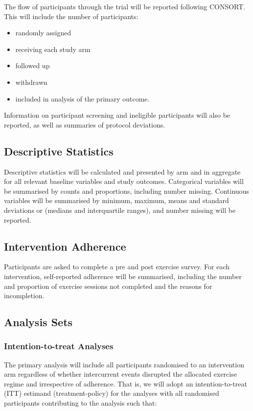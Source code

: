 \documentclass[11pt,parskip=half-]{scrartcl}
\providecommand{\tightlist}{%
  \setlength{\itemsep}{0pt}\setlength{\parskip}{0pt}}
\begin{document}
The flow of participants through the trial will be reported following CONSORT. This will include the number of participants:

\begin{itemize}
  \tightlist
  \item randomly assigned
  \item receiving each study arm
  \item followed up
  \item withdrawn
  \item included in analysis of the primary outcome.
\end{itemize}

Information on participant screening and ineligible participants will also be reported, as well as summaries of protocol deviations.

\subsection{Descriptive Statistics}\label{descriptive-statistics}

Descriptive statistics will be calculated and presented by arm and in aggregate for all relevant baseline variables and study outcomes. Categorical variables will be summarised by counts and proportions, including number missing. Continuous variables will be summarised by minimum, maximum, means and standard deviations or (medians and interquartile ranges), and number missing will be reported.

\subsection{Intervention Adherence}\label{adherence}

Participants are asked to complete a pre and post exercise survey. For each intervention, self-reported adherence will be summarised, including the number and proportion of exercise sessions not completed and the reasons for incompletion.

\subsection{Analysis Sets}\label{analysis-sets}

\subsubsection{Intention-to-treat Analyses}

The primary analysis will include all participants randomised to an intervention arm regardless of whether intercurrent events disrupted the allocated exercise regime and irrespective of adherence. That is, we will adopt an intention-to-treat (ITT) estimand (treatment-policy) for the analyses with all randomised participants contributing to the analysis such that:
\end{document}
